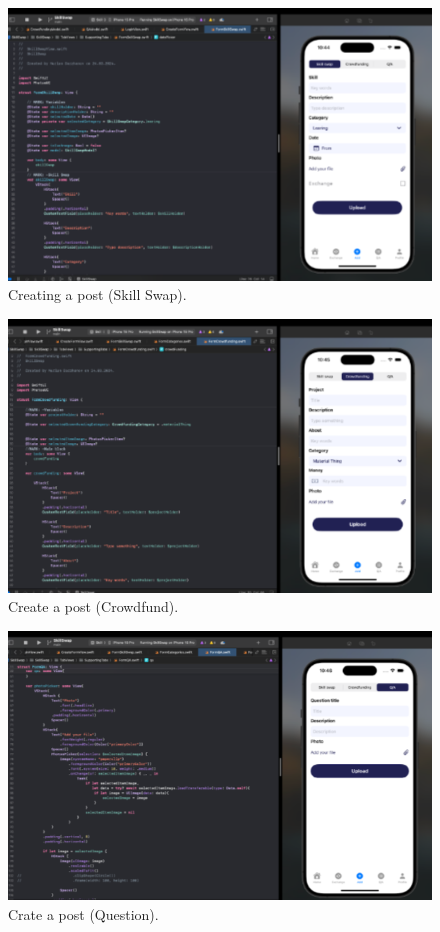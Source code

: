 \begin{figure}[H]\label{fig:createpstskillswap}
  \centering
  \includegraphics[width=0.8\linewidth]{figures/Creating a post (Skill Swap).png}
  \caption{Creating a post (Skill Swap).}
\end{figure}
\begin{figure}[H]\label{fig:createpstcrowd}
  \centering
  \includegraphics[width=0.8\linewidth]{figures/Create a post (Crowdfund).png}
  \caption{Create a post (Crowdfund).}
\end{figure}
\begin{figure}[H]\label{fig:createpstq}
  \centering
  \includegraphics[width=0.8\linewidth]{figures/Crate a post (Question).png}
  \caption{Crate a post (Question).}
\end{figure}